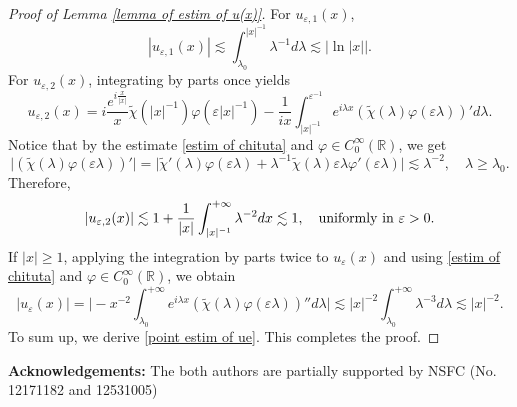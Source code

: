 \documentclass[reqno]{amsart}
\newcommand\R{\mathbb{R}}
\numberwithin{equation}{section}
\begin{document}
\begin{proof}[Proof of Lemma {\rm\ref{lemma of estim of u(x)}}]
For $u_{\varepsilon,1}(x)$, 
\begin{equation*}
 |u_{\varepsilon,1}(x)|\lesssim \int_{\lambda_0}^{|x|^{-1}}\lambda^{-1}d\lambda \lesssim |\ln|x||. 
\end{equation*}
For $u_{\varepsilon,2}(x)$, integrating by parts once yields
\begin{equation*}
 u_{\varepsilon,2}(x)=i\frac{e^{i\frac{x}{|x|}}}{x}\widetilde{\chi}(|x|^{-1})\varphi(\varepsilon|x|^{-1})-\frac{1}{ix}\int_{|x|^{-1}}^{\varepsilon^{-1}}e^{i\lambda x}(\widetilde{\chi}(\lambda)\varphi(\varepsilon\lambda))' d\lambda.
\end{equation*}
Notice that by the estimate \eqref{estim of chituta} and $\varphi\in C^{\infty}_0(\R)$, we get
$$\big|(\widetilde{\chi}(\lambda)\varphi(\varepsilon\lambda))'\big|=\big|\widetilde{\chi}'(\lambda)\varphi(\varepsilon\lambda)+\lambda^{-1}\widetilde{\chi}(\lambda)\varepsilon\lambda\varphi'(\varepsilon\lambda)\big|\lesssim\lambda^{-2},\quad \lambda\geq\lambda_0.$$
Therefore,
$$ |u_{\varepsilon,2}(x)|\lesssim 1+\frac{1}{|x|}\int_{|x|^{-1}}^{+\infty}\lambda^{-2}dx\lesssim1,\quad {\rm uniformly\ in \ }\varepsilon>0.$$
If $|x|\geq1$, applying the integration by parts twice to $u_{\varepsilon}(x)$ and using  \eqref{estim of chituta} and $\varphi\in C^{\infty}_0(\R)$, we obtain 
\begin{equation*}
|u_{\varepsilon}(x)|
=\Big|-x^{-2}\int_{\lambda_0}^{+\infty}e^{i\lambda x}(\widetilde{\chi}(\lambda)\varphi(\varepsilon\lambda))'' d\lambda\Big|\lesssim|x|^{-2}\int_{\lambda_0}^{+\infty}\lambda^{-3}d\lambda\lesssim|x|^{-2}.
\end{equation*}
To sum up, we derive \eqref{point estim of ue}. This completes the proof.
\end{proof}


\vskip0.5cm
{\bf Acknowledgements:} The both authors are partially supported by NSFC (No. 12171182 and 12531005)
\end{document}
